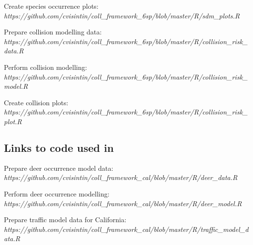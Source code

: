 \vspace{.3cm}
\noindent Create species occurrence plots:\\
\textit{https://github.com/cvisintin/coll\_framework\_6sp/blob/master/R/sdm\_plots.R}
%

\vspace{.3cm}
\noindent Prepare collision modelling data:\\
\textit{https://github.com/cvisintin/coll\_framework\_6sp/blob/master/R/collision\_risk\_data.R}
%

\vspace{.3cm}
\noindent Perform collision modelling:\\
\textit{https://github.com/cvisintin/coll\_framework\_6sp/blob/master/R/collision\_risk\_model.R}
%

\vspace{.3cm}
\noindent Create collision plots:\\
\textit{https://github.com/cvisintin/coll\_framework\_6sp/blob/master/R/collision\_risk\_plot.R}
%


\subsection{Links to code used in }

\noindent Prepare deer occurrence model data:\\
\textit{https://github.com/cvisintin/coll\_framework\_cal/blob/master/R/deer\_data.R}
%

\vspace{.3cm}
\noindent Perform deer occurrence modelling:\\
\textit{https://github.com/cvisintin/coll\_framework\_cal/blob/master/R/deer\_model.R}
%

\vspace{.3cm}
\noindent Prepare traffic model data for California:\\
\textit{https://github.com/cvisintin/coll\_framework\_cal/blob/master/R/traffic\_model\_data.R}
%

